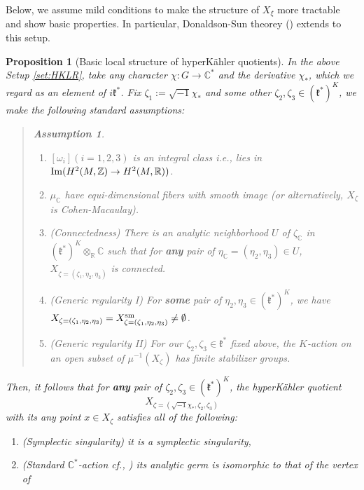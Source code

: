 \documentclass[12pt,a4paper]{amsart}
\newtheorem{Prop}[Thm]{Proposition}
\theoremstyle{remark}
\theoremstyle{definition}
\newtheorem*{Ass*}{Assumption}
\def\R{\mathbb{R}}
\def\C{\mathbb{C}}
\def\Z{\mathbb{Z}}
\begin{document}
\vspace{2mm}
Below, we assume mild 
conditions to make the structure of $X_\xi$ more tractable 
and show basic properties. In particular,  Donaldson-Sun theorey (\cite{DSII}) 
extends to this setup. 

\begin{Prop}[Basic local structure of hyperK\"ahler quotients]\label{DSHKQ}
In the above Setup \ref{set:HKLR}, 
take any character $\chi\colon G\to \C^*$ and the derivative 
$\chi_*$, which we regard as 
an element of $i\mathfrak{k}^*$. 
Fix $\zeta_1:=\sqrt{-1}\chi_*$ and some other 
$\zeta_2, \zeta_3\in (\mathfrak{k}^{*})^K$, 
we make the following standard assumptions: 
\vspace{-6mm}
\begin{quote}
\begin{Ass*}
\begin{enumerate}[label=(\alph*)]
\item \label{as:hodge}
$[\omega_i] (i=1,2,3)$ is an integral class 
i.e., lies in ${\rm Im}(H^2(M,\Z)\to H^2(M,\R))$. 
\item \label{as:equidim}
$\mu_\C$ have equi-dimensional fibers with smooth image 
(or alternatively, $X_\zeta$ is Cohen-Macaulay). 
\item \label{asi} (Connectedness) 
There is an analytic 
neighborhood $U$ of $\zeta_\C$ in $(\mathfrak{k}^{*})^K\otimes_{\R} 
\C$ 
such that for {\bf any} pair of 
$\eta_\C=(\eta_2, \eta_3)\in U$, 
$X_{\zeta=(\zeta_1,\eta_2,\eta_3)}$ is connected. 
\item \label{asii} (Generic regularity I) 
For {\bf some} pair of 
$\eta_2, \eta_3\in (\mathfrak{k}^{*})^K$, we have  $X_{\zeta=(\zeta_1,\eta_2,\eta_3)}=X_{\zeta=(\zeta_1,\eta_2,\eta_3)}^{\rm sm}\neq \emptyset$. 
\item \label{asiii} (Generic regularity II) 
For our 
$\zeta_2, \zeta_3\in \mathfrak{k}^*$ fixed above, 
the $K$-action on 
an open subset of $\mu^{-1}(X_\zeta)$ 
has finite stabilizer groups. 
\end{enumerate}
\end{Ass*}
\end{quote}
Then, it follows that for {\bf any} pair of 
$\zeta_2, \zeta_3\in (\mathfrak{k}^{*})^K$, 
the hyperK\"ahler quotient 
$$X_{\zeta=(\sqrt{-1}\chi_*,\zeta_2,\zeta_3)}$$ 
with its any point $x\in X_\zeta$ satisfies all of the following: 
\begin{enumerate}
    \item (Symplectic singularity) it is a symplectic singularity, 
    \item \label{SAHKQ} (Standard $\C^*$-action cf., \cite{May}) its analytic germ  is isomorphic to that of the vertex of 

\end{enumerate}
\end{Prop}
\end{document}
